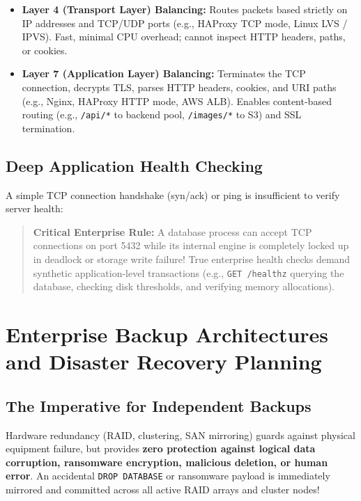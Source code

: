 \begin{itemize}
    \item \textbf{Layer 4 (Transport Layer) Balancing:} Routes packets based strictly on IP addresses and TCP/UDP ports (e.g., HAProxy TCP mode, Linux LVS / IPVS). Fast, minimal CPU overhead; cannot inspect HTTP headers, paths, or cookies.
    \item \textbf{Layer 7 (Application Layer) Balancing:} Terminates the TCP connection, decrypts TLS, parses HTTP headers, cookies, and URI paths (e.g., Nginx, HAProxy HTTP mode, AWS ALB). Enables content-based routing (e.g., \texttt{/api/*} to backend pool, \texttt{/images/*} to S3) and SSL termination.
\end{itemize}

\subsection{Deep Application Health Checking}
A simple TCP connection handshake (syn/ack) or ping is insufficient to verify server health:
\begin{quote}
\textbf{Critical Enterprise Rule:} A database process can accept TCP connections on port 5432 while its internal engine is completely locked up in deadlock or storage write failure! True enterprise health checks demand synthetic application-level transactions (e.g., \texttt{GET /healthz} querying the database, checking disk thresholds, and verifying memory allocations).
\end{quote}

\section{Enterprise Backup Architectures and Disaster Recovery Planning}
\label{sec:os_backup_dr}

\subsection{The Imperative for Independent Backups}
Hardware redundancy (RAID, clustering, SAN mirroring) guards against physical equipment failure, but provides \textbf{zero protection against logical data corruption, ransomware encryption, malicious deletion, or human error}. An accidental \texttt{DROP DATABASE} or ransomware payload is immediately mirrored and committed across all active RAID arrays and cluster nodes!

